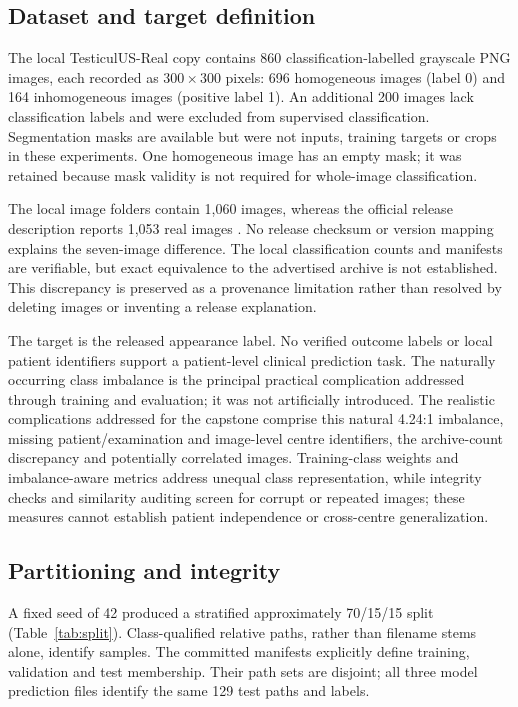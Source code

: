 \documentclass[11pt,a4paper]{article}
\begin{document}
\subsection{Dataset and target definition}
The local TesticulUS-Real copy contains 860 classification-labelled grayscale PNG images, each recorded as $300\times300$ pixels: 696 homogeneous images (label 0) and 164 inhomogeneous images (positive label 1). An additional 200 images lack classification labels and were excluded from supervised classification. Segmentation masks are available but were not inputs, training targets or crops in these experiments. One homogeneous image has an empty mask; it was retained because mask validity is not required for whole-image classification.

The local image folders contain 1,060 images, whereas the official release description reports 1,053 real images \citep{dataset,2026BMVC}. No release checksum or version mapping explains the seven-image difference. The local classification counts and manifests are verifiable, but exact equivalence to the advertised archive is not established. This discrepancy is preserved as a provenance limitation rather than resolved by deleting images or inventing a release explanation.

The target is the released appearance label. No verified outcome labels or local patient identifiers support a patient-level clinical prediction task. The naturally occurring class imbalance is the principal practical complication addressed through training and evaluation; it was not artificially introduced.
The realistic complications addressed for the capstone comprise this natural 4.24:1 imbalance, missing patient/examination and image-level centre identifiers, the archive-count discrepancy and potentially correlated images. Training-class weights and imbalance-aware metrics address unequal class representation, while integrity checks and similarity auditing screen for corrupt or repeated images; these measures cannot establish patient independence or cross-centre generalization.

\subsection{Partitioning and integrity}
A fixed seed of 42 produced a stratified approximately 70/15/15 split (Table~\ref{tab:split}). Class-qualified relative paths, rather than filename stems alone, identify samples. The committed manifests explicitly define training, validation and test membership. Their path sets are disjoint; all three model prediction files identify the same 129 test paths and labels.
\end{document}
